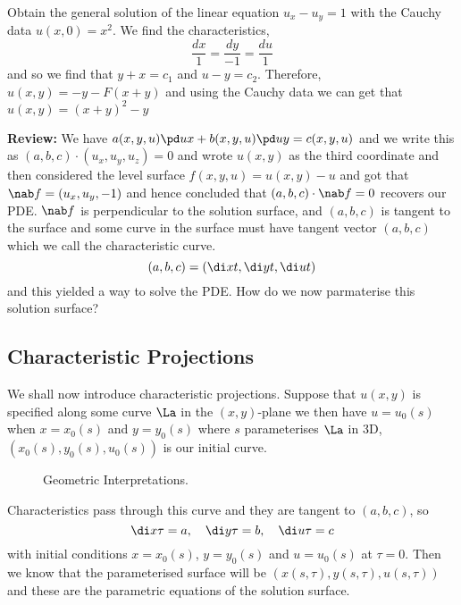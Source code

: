 \begin{eg}
  Obtain the general solution of the linear equation $u_x - u_y = 1$ with the Cauchy data $u(x, 0) = x^2$. We find the characteristics,
  $$ \frac{dx}{1} = \frac{dy}{-1} = \frac{du}{1} $$
  and so we find that $y + x = c_1$ and $u - y = c_2$. Therefore, $u(x, y) = -y - F(x + y)$ and using the Cauchy data we can get that $u(x, y) = (x + y)^2 - y$
\end{eg}

\noindent
\textbf{Review:} We have $a(x, y, u) \pd u x + b(x, y, u)\pd u y = c(x, y, u)$ and we write this as $(a, b, c) \cdot (u_x, u_y, u_z) = 0$ and wrote $u(x, y)$ as the third coordinate and then considered the level surface $f(x, y, u) = u(x, y) - u$ and got that $\nab f = (u_x, u_y, -1)$ and hence concluded that $(a, b, c) \cdot \nab f = 0$ recovers our PDE. $\nab f$ is perpendicular to the solution surface, and $(a, b, c)$ is tangent to the surface and some curve in the surface must have tangent vector $(a, b, c)$ which we call the characteristic curve.
$$ (a, b, c) = \left(\di x t, \di y t, \di u t\right) $$
and this yielded a way to solve the PDE. How do we now parmaterise this solution surface?\\

\subsection{Characteristic Projections}

\noindent
We shall now introduce characteristic projections. Suppose that $u(x, y)$ is specified along some curve $\La$ in the $(x, y)$-plane we then have $u = u_0(s)$ when $x = x_0(s)$ and $y = y_0(s)$ where $s$ parameterises $\La$ in 3D, $(x_0(s), y_0(s), u_0(s))$ is our initial curve.\\

\begin{figure}[!ht]
\centering
\resizebox{0.5\textwidth}{!}{}
\caption{Geometric Interpretations.}
\end{figure}

Characteristics pass through this curve and they are tangent to $(a, b, c)$, so
$$ \di x \tau = a, \quad \di y \tau = b, \quad \di u \tau = c $$
with initial conditions $x = x_0(s)$, $y = y_0(s)$ and $u = u_0(s)$ at $\tau = 0$. Then we know that the parameterised surface will be $(x(s, \tau), y(s, \tau), u(s, \tau))$and these are the parametric equations of the solution surface.

